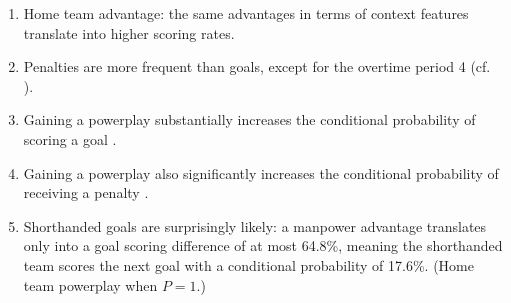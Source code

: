 \documentclass[]{article}
\begin{document}
\begin{enumerate}
\item Home team advantage: the same advantages in terms of context features translate into higher scoring rates.
\item Penalties are more frequent than goals, except for the overtime period 4 (cf. \citep{Schuckers2012}).
\item Gaining a powerplay substantially increases the conditional probability of scoring a goal \citep{Thomas2013}.
\item Gaining a powerplay also significantly increases the conditional probability of receiving a penalty \citep{Schuckers2012}.
\item Shorthanded goals are surprisingly likely: a manpower advantage translates only into a goal scoring difference of at most 64.8\%, meaning the shorthanded team scores the next goal with a conditional probability of 17.6\%. (Home team powerplay when $P=1$.)

\end{enumerate}
\end{document}
